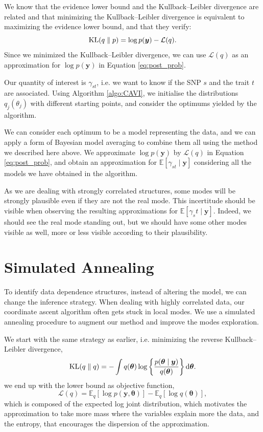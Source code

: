 \documentclass[a4paper, 11pt]{report}
\numberwithin{equation}{chapter}
\DeclareMathOperator*{\KL}{{\rm KL}}
\begin{document}
We know that the evidence lower bound and the Kullback--Leibler divergence are related and that minimizing the Kullback--Leibler divergence is equivalent to maximizing the evidence lower bound, and that they verify: 
\begin{equation*}
\KL(q\parallel p) = \log p (\boldsymbol{y}) - \mathcal{L}(q).
\end{equation*}
Since we minimized the Kullback--Leibler divergence, we can use $\mathcal{L}(q)$ as an approximation for $\log p(\boldsymbol{y})$ in Equation \ref{eq:post_prob}.

Our quantity of interest is $\gamma_{st}$, i.e. we want to know if the SNP $s$ and the trait $t$ are associated. Using Algorithm \ref{algo:CAVI}, we initialise the distributions $q_j(\theta_j)$ with different starting points, and consider the optimums yielded by the algorithm.

We can consider each optimum to be a model representing the data, and we can apply a form of Bayesian model averaging to combine them all using the method we described here above. We approximate $\log p(\boldsymbol{y})$ by $\mathcal{L}(q)$ in Equation \ref{eq:post_prob}, and obtain an approximation for $\mathbb{E}\left[\gamma_{st}\mid \boldsymbol{y}\right]$ considering all the models we have obtained in the algorithm.

As we are dealing with strongly correlated structures, some modes will be strongly plausible even if they are not the real mode. This incertitude should be visible when observing the resulting approximations for $\mathbb{E}\left[\gamma_st\mid \boldsymbol{y}\right]$. Indeed, we should see the real mode standing out, but we should have some other modes visible as well, more or less visible according to their plausibility.
\newpage
\section{Simulated Annealing}
To identify data dependence structures, instead of altering the model, we can change the inference strategy. When dealing with highly correlated data, our coordinate ascent algorithm often gets stuck in local modes. We use a simulated annealing procedure to augment our method and improve the modes exploration.

We start with the same strategy as earlier, i.e. minimizing the reverse Kullback--Leibler divergence,
\begin{equation*}
\KL(q \parallel q) = -\int q(\boldsymbol{\theta}) \log\left\lbrace\frac{p(\boldsymbol{\theta}\mid\boldsymbol{y})}{q(\boldsymbol{\theta})}\right\rbrace \mathrm{d}\boldsymbol{\theta}.
\end{equation*}
we end up with the lower bound as objective function,
\begin{equation*}
\mathcal{L}(q) = \mathbb{E}_q\left[ \log p(\boldsymbol{y}, \boldsymbol{\theta})\right] - \mathbb{E}_q\left[\log q(\boldsymbol{\theta})\right],
\end{equation*}
which is composed of the expected log joint distribution, which motivates the approximation to take more mass where the variables explain more the data, and the entropy, that encourages the dispersion of the approximation. 
\end{document}
